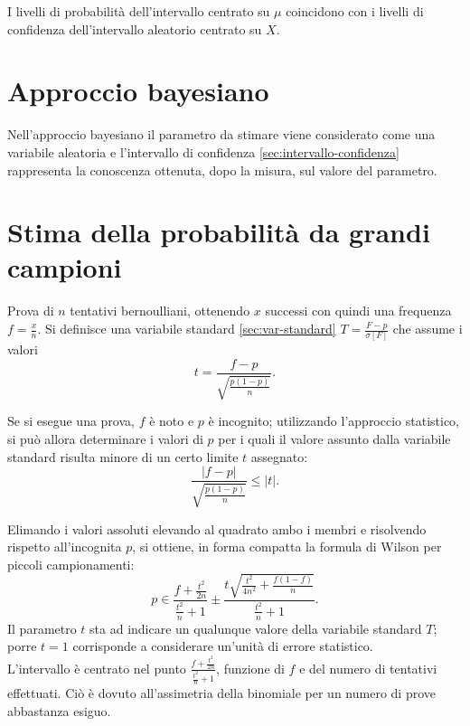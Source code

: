 I livelli di probabilità dell'intervallo centrato su $\mu$ coincidono con i livelli di confidenza dell'intervallo aleatorio centrato su $X$.

\section{Approccio bayesiano} %
\label{sec:bayesiano}
Nell'approccio bayesiano il parametro da stimare viene considerato come una variabile aleatoria e l'intervallo di confidenza \ref{sec:intervallo-confidenza} rappresenta la conoscenza ottenuta, dopo la misura, sul valore del parametro.

\section{Stima della probabilità da grandi campioni} %
\label{sec:stima-prob-grandi}
Prova di $n$ tentativi bernoulliani, ottenendo $x$ successi con quindi una frequenza $f=\frac{x}{n}$. Si definisce una variabile standard \ref{sec:var-standard} $T=\frac { F-p }{ \sigma \left[ F \right]  } $ che assume i valori 
\begin{equation}
t=\frac { f-p }{ \sqrt { \frac { p\left( 1-p \right)  }{ n }  }  } .
\end{equation}

Se si esegue una prova, $f$ è noto e $p$ è incognito; utilizzando l'approccio statistico, si può allora determinare i valori di $p$ per i quali il valore assunto dalla variabile standard risulta minore di un certo limite $t$ assegnato:
\begin{equation}
\frac { \left| f-p \right|  }{ \sqrt { \frac { p\left( 1-p \right)  }{ n }  }  } \le \left| t \right| .
\end{equation}

Elimando i valori assoluti elevando al quadrato ambo i membri e risolvendo rispetto all'incognita $p$, si ottiene, in forma compatta la formula di Wilson per piccoli campionamenti:
\begin{equation}
\label{eq:wilson-piccoli}
p\in \frac { f+\frac { t^{ 2 } }{ 2n }  }{ \frac { t^{ 2 } }{ n } +1 } \pm \frac { t\sqrt { \frac { t^{ 2 } }{ 4n^{ 2 } } +\frac { f\left( 1-f \right)  }{ n }  }  }{ \frac { t^{ 2 } }{ n } +1 } .
\end{equation}
Il parametro $t$ sta ad indicare un qualunque valore della variabile standard $T$; porre $t=1$ corrisponde a considerare un'unità di errore statistico. \\ L'intervallo è centrato nel punto $\frac { f+\frac { t^{ 2 } }{ 2n }  }{ \frac { t^{ 2 } }{ n } +1 } $, funzione di $f$ e del numero di tentativi effettuati. Ciò è dovuto all'assimetria della binomiale per un numero di prove abbastanza esiguo.

